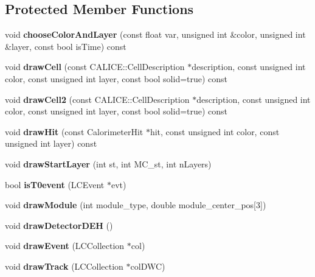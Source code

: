 \subsection*{Protected Member Functions}
\begin{DoxyCompactItemize}
\item 
void {\bfseries choose\-Color\-And\-Layer} (const float var, unsigned int \&color, unsigned int \&layer, const bool is\-Time) const \label{classCALICE_1_1DEHEventDisplayProcessor_ac3a2cd66ec049d6dc9d1be7e4829ff97}

\item 
void {\bfseries draw\-Cell} (const C\-A\-L\-I\-C\-E\-::\-Cell\-Description $\ast$description, const unsigned int color, const unsigned int layer, const bool solid=true) const \label{classCALICE_1_1DEHEventDisplayProcessor_a50d7ae11587eaffc110175b5a2ae36b0}

\item 
void {\bfseries draw\-Cell2} (const C\-A\-L\-I\-C\-E\-::\-Cell\-Description $\ast$description, const unsigned int color, const unsigned int layer, const bool solid=true) const \label{classCALICE_1_1DEHEventDisplayProcessor_a2ec7b70ac889295aebe4252d893ca824}

\item 
void {\bfseries draw\-Hit} (const Calorimeter\-Hit $\ast$hit, const unsigned int color, const unsigned int layer) const \label{classCALICE_1_1DEHEventDisplayProcessor_ad392af5f327b5237ea67100bb7ae4c08}

\item 
void {\bfseries draw\-Start\-Layer} (int st, int M\-C\-\_\-st, int n\-Layers)\label{classCALICE_1_1DEHEventDisplayProcessor_ab865f57c34a1678a857a1f0b51e0e856}

\item 
bool {\bfseries is\-T0event} (L\-C\-Event $\ast$evt)\label{classCALICE_1_1DEHEventDisplayProcessor_a90277317c86ea420cdb2134226911ce2}

\item 
void {\bfseries draw\-Module} (int module\-\_\-type, double module\-\_\-center\-\_\-pos[3])\label{classCALICE_1_1DEHEventDisplayProcessor_a418386562f71c855a4fb0e63043dc5b0}

\item 
void {\bfseries draw\-Detector\-D\-E\-H} ()\label{classCALICE_1_1DEHEventDisplayProcessor_a597cfeb5229cfecdace31719ac7ab310}

\item 
void {\bfseries draw\-Event} (L\-C\-Collection $\ast$col)\label{classCALICE_1_1DEHEventDisplayProcessor_afd7f3ba14295ded2c618286f193f7935}

\item 
void {\bfseries draw\-Track} (L\-C\-Collection $\ast$col\-D\-W\-C)\label{classCALICE_1_1DEHEventDisplayProcessor_a457826afbf89e0097d088a47a5001122}

\end{DoxyCompactItemize}
